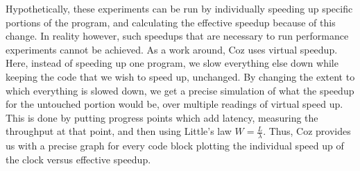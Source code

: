 \documentclass[twoside]{article}
\begin{document}
Hypothetically, these experiments can be run by individually speeding up specific portions of the program, and calculating the effective speedup because of this change. In reality however, such speedups that are necessary to run performance experiments cannot be achieved. As a work around, Coz uses virtual speedup. Here, instead of speeding up one program, we slow everything else down while keeping the code that we wish to speed up, unchanged. By changing the extent to which everything is slowed down, we get a precise simulation of what the speedup for the untouched portion would be, over multiple readings of virtual speed up. This is done by putting progress points which add latency, measuring the throughput at that point, and then using Little's law \(W = \frac{L}{\lambda} \). Thus, Coz provides us with a precise graph for every code block plotting the individual speed up of the clock versus effective speedup.
\end{document}
